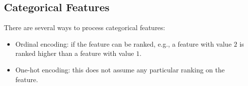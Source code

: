 

 
 \subsection{Categorical Features}
    There are several ways to process categorical features:
        \begin{itemize}
            \item Ordinal encoding: if the feature can be ranked, e.g., a feature with value $2$ is ranked higher than a feature with value $1$.
            \item One-hot encoding: this does not assume any particular ranking on the feature.
        \end{itemize}